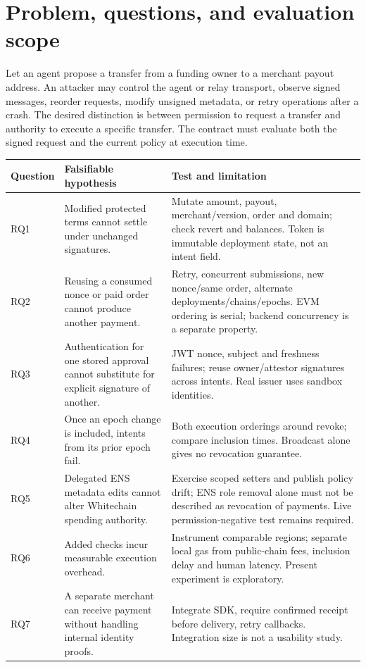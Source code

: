 \documentclass[11pt]{article}
\begin{document}
\section{Problem, questions, and evaluation scope}
Let an agent propose a transfer from a funding owner to a merchant payout address. An attacker may control the agent or relay transport, observe signed messages, reorder requests, modify unsigned metadata, or retry operations after a crash. The desired distinction is between permission to request a transfer and authority to execute a specific transfer. The contract must evaluate both the signed request and the current policy at execution time.

\begin{longtable}{p{.105\linewidth}p{.355\linewidth}p{.44\linewidth}}
\toprule Question & Falsifiable hypothesis & Test and limitation\\\midrule
RQ1 & Modified protected terms cannot settle under unchanged signatures. & Mutate amount, payout, merchant/version, order and domain; check revert and balances. Token is immutable deployment state, not an intent field.\\
RQ2 & Reusing a consumed nonce or paid order cannot produce another payment. & Retry, concurrent submissions, new nonce/same order, alternate deployments/chains/epochs. EVM ordering is serial; backend concurrency is a separate property.\\
RQ3 & Authentication for one stored approval cannot substitute for explicit signature of another. & JWT nonce, subject and freshness failures; reuse owner/attestor signatures across intents. Real issuer uses sandbox identities.\\
RQ4 & Once an epoch change is included, intents from its prior epoch fail. & Both execution orderings around revoke; compare inclusion times. Broadcast alone gives no revocation guarantee.\\
RQ5 & Delegated ENS metadata edits cannot alter Whitechain spending authority. & Exercise scoped setters and publish policy drift; ENS role removal alone must not be described as revocation of payments. Live permission-negative test remains required.\\
RQ6 & Added checks incur measurable execution overhead. & Instrument comparable regions; separate local gas from public-chain fees, inclusion delay and human latency. Present experiment is exploratory.\\
RQ7 & A separate merchant can receive payment without handling internal identity proofs. & Integrate SDK, require confirmed receipt before delivery, retry callbacks. Integration size is not a usability study.\\\bottomrule
\end{longtable}
\end{document}
